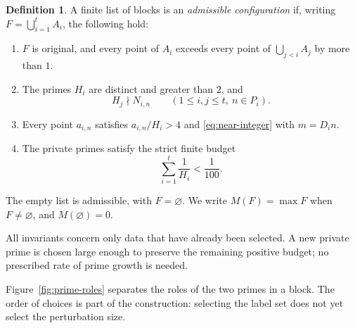 \documentclass[11pt,reqno]{amsart}
\theoremstyle{definition}
\newtheorem{definition}[theorem]{Definition}
\theoremstyle{remark}
\numberwithin{equation}{section}
\begin{document}
\begin{definition}\label{def:admissible}
A finite list of blocks is an \emph{admissible configuration} if, writing
$F=\bigcup_{i=1}^t A_i$, the following hold:
\begin{enumerate}
\item[(I1)] $F$ is original, and every point of $A_i$ exceeds every point
of $\bigcup_{j<i}A_j$ by more than $1$.
\item[(I2)] The primes $H_i$ are distinct and greater than $2$, and
\begin{equation}\label{eq:private-invariant}
 H_j\nmid N_{i,n}\qquad
 (1\leq i,j\leq t,\ n\in P_i).
\end{equation}
\item[(I3)] Every point $a_{i,n}$ satisfies
$a_{i,n}/H_i>4$ and \eqref{eq:near-integer} with $m=D_i n$.
\item[(I4)] The private primes satisfy the strict finite budget
\begin{equation}\label{eq:reciprocal-primes}
 \sum_{i=1}^t\frac1{H_i}<\frac1{100}.
\end{equation}
\end{enumerate}
The empty list is admissible, with $F=\varnothing$. We write
$M(F)=\max F$ when $F\ne\varnothing$, and $M(\varnothing)=0$.
\end{definition}

All invariants concern only data that have already been selected. A new
private prime is chosen large enough to preserve the remaining positive
budget; no prescribed rate of prime growth is needed.

Figure~\ref{fig:prime-roles} separates the roles of the two primes in a
block. The order of choices is part of the construction: selecting the
label set does not yet select the perturbation size.
\end{document}
